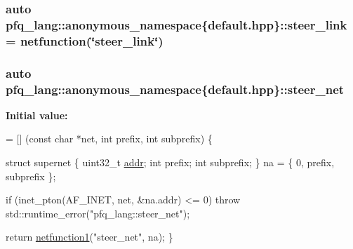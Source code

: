 \hypertarget{namespacepfq__lang_1_1anonymous__namespace_02default_8hpp_03_af339132b49ec24313a1b3d33cefb1628}{
\subsubsection[{steer\+\_\+link}]{\setlength{\rightskip}{0pt plus 5cm}auto pfq\+\_\+lang\+::anonymous\+\_\+namespace\{default.\+hpp\}\+::steer\+\_\+link = {\bf netfunction}(\char`\"{}steer\+\_\+link\char`\"{})}}\label{namespacepfq__lang_1_1anonymous__namespace_02default_8hpp_03_af339132b49ec24313a1b3d33cefb1628}
\hypertarget{namespacepfq__lang_1_1anonymous__namespace_02default_8hpp_03_a2c53e95204f3841919f780940b607d68}{
\subsubsection[{steer\+\_\+net}]{\setlength{\rightskip}{0pt plus 5cm}auto pfq\+\_\+lang\+::anonymous\+\_\+namespace\{default.\+hpp\}\+::steer\+\_\+net}}\label{namespacepfq__lang_1_1anonymous__namespace_02default_8hpp_03_a2c53e95204f3841919f780940b607d68}
{\bfseries Initial value\+:}
\begin{DoxyCode}
= [] (\textcolor{keyword}{const} \textcolor{keywordtype}{char} *net, \textcolor{keywordtype}{int} prefix, \textcolor{keywordtype}{int} subprefix) \{

                                \textcolor{keyword}{struct }supernet \{
                                    uint32\_t \hyperlink{namespacepfq__lang_1_1anonymous__namespace_02default_8hpp_03_aafce8334d1be83bff9a2115439c8c453}{addr};
                                    \textcolor{keywordtype}{int}      prefix;
                                    \textcolor{keywordtype}{int}      subprefix;
                                \} na = \{ 0, prefix, subprefix \};

                                \textcolor{keywordflow}{if} (inet\_pton(AF\_INET, net, &na.addr) <= 0)
                                    \textcolor{keywordflow}{throw} std::runtime\_error(\textcolor{stringliteral}{"pfq\_lang::steer\_net"});

                                \textcolor{keywordflow}{return} \hyperlink{namespacepfq__lang_af215f25fa7ebd61fdc90cf0ef78a3164}{netfunction1}(\textcolor{stringliteral}{"steer\_net"}, na);
                             \}
\end{DoxyCode}
